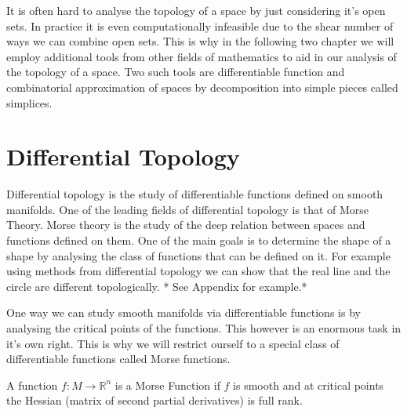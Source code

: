 It is often hard to analyse the topology of a space by just considering it's open sets. In practice it is even computationally infeasible due to the shear number of ways we can combine open sets. This is why in the following two chapter we will employ additional tools from other fields of mathematics to aid in our analysis of the topology of a space. Two such tools are differentiable function and combinatorial approximation of spaces by decomposition into simple pieces called simplices.













\section{Differential Topology}

Differential topology is the study of differentiable functions defined on smooth manifolds. One of the leading fields of differential topology is that of Morse Theory. Morse theory is the study of the deep relation between spaces and functions defined on them. One of the main goals is to determine the shape of a shape by analysing the class of functions that can be defined on it. For example using methods from differential topology we can show that the real line and the circle are different topologically. * See Appendix for example.*

One way we can study smooth manifolds via differentiable functions is by analysing the critical points of the functions. This however is an enormous task in it's own right. This is why we will restrict ourself to a special class of differentiable functions called Morse functions.

\begin{defn} A function $f: M \to \mathbb{R}^n$ is a Morse Function if $f$ is smooth and at critical points the Hessian (matrix of second partial derivatives) is full rank.   \end{defn}

